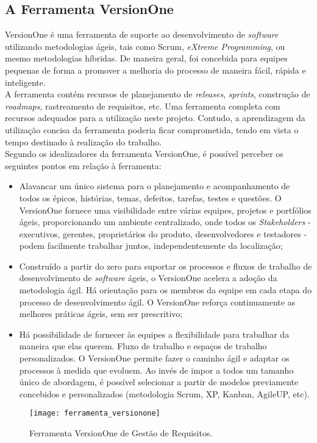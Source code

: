 		\subsection[A Ferramenta VersionOne]{A Ferramenta VersionOne}
		\label{subsec:ferramenta_analise_versionone}
			VersionOne é uma ferramenta de suporte ao desenvolvimento de \emph{software} utilizando metodologias ágeis, tais como Scrum, \emph{eXtreme Programming}, ou mesmo metodologias híbridas. De maneira geral, foi concebida para equipes pequenas de forma a promover a melhoria do processo de maneira fácil, rápida e inteligente.
			\\ \indent A ferramenta contém recursos de planejamento de \emph{releases}, \emph{sprints}, construção de \emph{roadmaps}, rastreamento de requisitos, etc. Uma ferramenta completa com recursos adequados para a utilização neste projeto. Contudo, a aprendizagem da utilização concisa da ferramenta poderia ficar comprometida, tendo em vista o tempo destinado à realização do trabalho.
			\\ \indent Segundo os idealizadores da ferramenta VersionOne, é possível perceber os seguintes pontos em relação à ferramenta:
			\begin{itemize}
				\item{Alavancar um único sistema para o planejamento e acompanhamento de todos os épicos, histórias, temas, defeitos, tarefas, testes e questões. O VersionOne fornece uma visibilidade entre várias equipes, projetos e portfólios ágeis, proporcionando um ambiente centralizado, onde todos os \emph{Stakeholders} - executivos, gerentes, proprietários do produto, desenvolvedores e testadores - podem facilmente trabalhar juntos, independentemente da localização;}
				\item{Construído a partir do zero para suportar os processos e fluxos de trabalho de desenvolvimento de \emph{software} ágeis, o VersionOne acelera a adoção da metodologia ágil. Há orientação para os membros da equipe em cada etapa do processo de desenvolvimento ágil. O VersionOne reforça continuamente as melhores práticas ágeis, sem ser prescritivo;}
				\item{Há possibilidade de fornecer às equipes a flexibilidade para trabalhar da maneira que elas querem. Fluxo de trabalho e espaços de trabalho personalizados. O VersionOne permite fazer o caminho ágil e adaptar os processos à medida que evoluem. Ao invés de impor a todos um tamanho único de abordagem, é possível selecionar a partir de modelos previamente concebidos e personalizados (metodologia Scrum, XP, Kanban, AgileUP, etc).}
			\end{itemize}
			\begin{figure}[h]
				\centering
				\texttt{[image: ferramenta\_versionone]}
				\caption[Ferramenta VersionOne de Gestão de Requisitos]{Ferramenta VersionOne de Gestão de Requisitos.}
				\label{fig:ferramenta_versionone}
			\end{figure}

